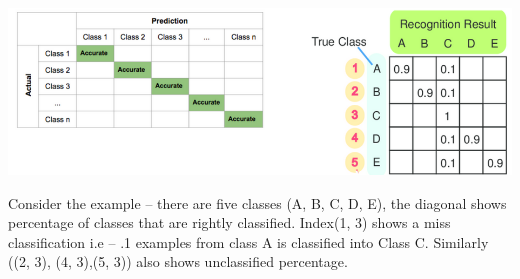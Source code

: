 \begin{center}
    \includegraphics[width=.8\textwidth]{Images/A20_img2.png}
\end{center}

Consider the example – there are five classes (A, B, C, D, E), the diagonal shows percentage of classes that are rightly classified. Index(1, 3) shows a miss classification i.e – .1 examples from class A is classified into Class C. Similarly ((2, 3), (4, 3),(5, 3)) also shows unclassified percentage. \\ 